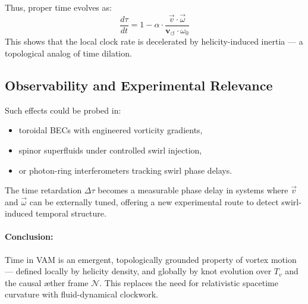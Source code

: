 Thus, proper time evolves as:
\[
    \boxed{
    \frac{d\tau}{dt} = 1 - \alpha \cdot \frac{\vec{v} \cdot \vec{\omega}}{\mathbf{v}_{\scriptscriptstyle\boldsymbol{\circlearrowleft}} \cdot \omega_0}
    }
\]
This shows that the local clock rate is decelerated by helicity-induced inertia — a topological analog of time dilation.

\subsection*{Observability and Experimental Relevance}

Such effects could be probed in:
\begin{itemize}
  \item toroidal BECs with engineered vorticity gradients,
  \item spinor superfluids under controlled swirl injection,
  \item or photon-ring interferometers tracking swirl phase delays.
\end{itemize}

The time retardation \( \Delta \tau \) becomes a measurable phase delay in systems where \( \vec{v} \) and \( \vec{\omega} \) can be externally tuned, offering a new experimental route to detect swirl-induced temporal structure.

\paragraph{Conclusion:} Time in VAM is an emergent, topologically grounded property of vortex motion — defined locally by helicity density, and globally by knot evolution over \( T_v \) and the causal æther frame \( \mathcal{N} \). This replaces the need for relativistic spacetime curvature with fluid-dynamical clockwork.
